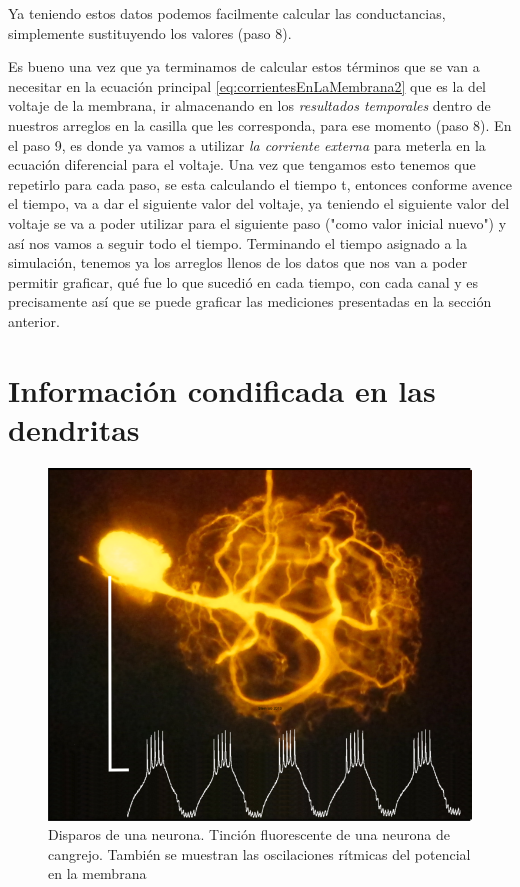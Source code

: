 Ya teniendo estos datos podemos facilmente calcular las conductancias, simplemente sustituyendo los valores (paso 8).

Es bueno una vez que ya terminamos de calcular estos términos que se van a necesitar en la ecuación principal  \ref{eq:corrientesEnLaMembrana2} que es la del voltaje de la membrana,  ir almacenando en los \emph{resultados temporales} dentro de nuestros arreglos en la casilla que les corresponda, para ese momento (paso 8). En el paso 9, es donde ya vamos a utilizar \emph{la corriente externa} para meterla en la ecuación diferencial para el voltaje. Una vez que tengamos esto tenemos que repetirlo para cada paso, se esta calculando el tiempo t,  entonces conforme avence el tiempo, va a dar el siguiente valor del voltaje, ya teniendo el siguiente valor del voltaje se va a poder utilizar para el siguiente paso ("como valor inicial nuevo") y así nos vamos a seguir todo el tiempo. 
Terminando el tiempo asignado a la simulación, tenemos ya los arreglos llenos de los datos que nos van a poder permitir graficar, qué fue lo que sucedió en cada tiempo, con cada canal y es precisamente  así que se puede graficar las mediciones presentadas en la sección anterior.

\section{Información condificada en las dendritas}
\begin{figure}[h]
 \centering
 \includegraphics[scale=0.7]{../Figuras/neuron_staining_and_recording.png}
 \caption{Disparos de una neurona. Tinción fluorescente de una neurona de cangrejo. También se muestran las oscilaciones
rítmicas del potencial en la membrana}
 \label{fig:neuronStaining}
\end{figure}

